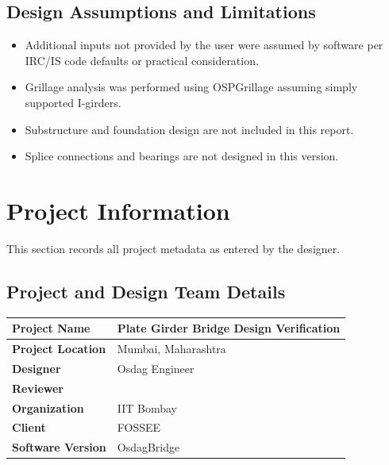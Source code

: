 \documentclass[12pt,a4paper]{report}
\numberwithin{table}{chapter}
\numberwithin{figure}{chapter}
\begin{document}
\section*{Design Assumptions and Limitations}
\label{sec:assumptions}

\begin{itemize}
\item Additional inputs not provided by the user were assumed by software per IRC/IS code defaults or practical consideration.
\item Grillage analysis was performed using OSPGrillage assuming simply supported I-girders.
\item Substructure and foundation design are not included in this report.
\item Splice connections and bearings are not designed in this version.
\end{itemize}

\titleformat{\chapter}[block]{\normalfont\Large\bfseries\centering}{\thechapter}{1em}{}
\titlespacing*{\chapter}{0pt}{-30pt}{10pt}


\chapter{Project Information}

This section records all project metadata as entered by the designer.

\section{Project and Design Team Details}
\label{sec:project-details}

\begin{tabular}{|L{5.5cm}|L{8.5cm}|}
\hline
\textbf{Project Name} & Plate Girder Bridge Design Verification \\
\hline
\textbf{Project Location} & Mumbai, Maharashtra \\
\hline
\textbf{Designer} & Osdag Engineer \\
\hline
\textbf{Reviewer} &  \\
\hline
\textbf{Organization} & IIT Bombay \\
\hline
\textbf{Client} & FOSSEE \\
\hline
\textbf{Software Version} & OsdagBridge \\
\hline
\end{tabular}
\end{document}
